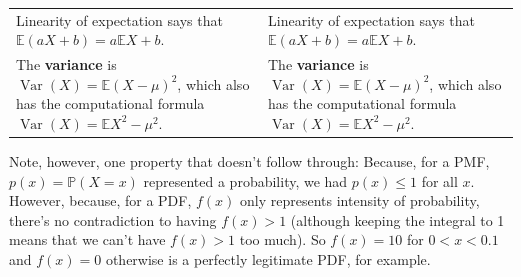 \documentclass[
  a4paper,
]{book}
\theoremstyle{definition}
\theoremstyle{definition}
\theoremstyle{definition}
\theoremstyle{definition}
\theoremstyle{remark}
\begin{document}
\begin{longtable}[]{@{}
  >{\raggedright\arraybackslash}p{}
  >{\raggedright\arraybackslash}p{}@{}}
Linearity of expectation says that \( \mathbb E(aX+b) = a\mathbb EX + b .\) & Linearity of expectation says that \( \mathbb E(aX+b) = a\mathbb EX + b .\) \\
The \textbf{variance} is \(\operatorname{Var}(X) = \mathbb E(X - \mu)^2\), which also has the computational formula \(\operatorname{Var}(X) = \mathbb EX^2 - \mu^2\). & The \textbf{variance} is \(\operatorname{Var}(X) = \mathbb E(X - \mu)^2\), which also has the computational formula \(\operatorname{Var}(X) = \mathbb EX^2 - \mu^2\). \\
\bottomrule()
\end{longtable}

Note, however, one property that doesn't follow through: Because, for a PMF, \(p(x) = \mathbb P(X = x)\) represented a probability, we had \(p(x) \leq 1\) for all \(x\). However, because, for a PDF, \(f(x)\) only represents intensity of probability, there's no contradiction to having \(f(x) > 1\) (although keeping the integral to 1 means that we can't have \(f(x) > 1\) too much). So \(f(x) = 10\) for \(0 <x < 0.1\) and \(f(x) = 0\) otherwise is a perfectly legitimate PDF, for example.
\end{document}
